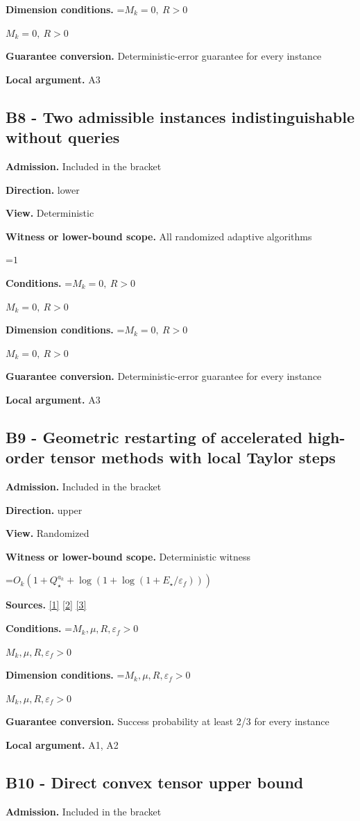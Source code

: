 \documentclass[10pt,a4paper]{article}
\newcommand{\AtlasMath}[1]{\par\begingroup\centering\setbox0=\hbox{$\displaystyle #1$}\ifdim\wd0>1.4\linewidth\typeout{ATLAS WIDE FORMULA: \the\wd0}\fi\ifdim\wd0>\linewidth\resizebox{\linewidth}{!}{\box0}\else\box0\fi\par\endgroup}
\newcommand{\AtlasInlineMath}[1]{\begingroup\setbox0=\hbox{$#1$}\ifdim\wd0>.4\linewidth\endgroup\AtlasMath{#1}\else\endgroup$#1$\fi}
\begin{document}
\textbf{Dimension conditions.} \AtlasInlineMath{M_k=0,\ R>0}

\textbf{Guarantee conversion.} Deterministic-error guarantee for every instance

\textbf{Local argument.} A3

\subsection{B8 - Two admissible instances indistinguishable without queries}
\textbf{Admission.} Included in the bracket

\textbf{Direction.} lower

\textbf{View.} Deterministic

\textbf{Witness or lower-bound scope.} All randomized adaptive algorithms

\AtlasMath{1}
\textbf{Conditions.} \AtlasInlineMath{M_k=0,\ R>0}

\textbf{Dimension conditions.} \AtlasInlineMath{M_k=0,\ R>0}

\textbf{Guarantee conversion.} Deterministic-error guarantee for every instance

\textbf{Local argument.} A3

\subsection{B9 - Geometric restarting of accelerated high-order tensor methods with local Taylor steps}
\textbf{Admission.} Included in the bracket

\textbf{Direction.} upper

\textbf{View.} Randomized

\textbf{Witness or lower-bound scope.} Deterministic witness

\AtlasMath{O_k(1+Q_\star^{a_k}+\log(1+\log(1+E_\star/\varepsilon_f)))}
\textbf{Sources.} \href{https://arxiv.org/pdf/2205.09647v1}{[1]} \href{https://arxiv.org/pdf/2010.06642v2}{[2]} \href{https://arxiv.org/pdf/1705.07260v2}{[3]}

\textbf{Conditions.} \AtlasInlineMath{M_k,\mu,R,\varepsilon_f>0}

\textbf{Dimension conditions.} \AtlasInlineMath{M_k,\mu,R,\varepsilon_f>0}

\textbf{Guarantee conversion.} Success probability at least 2/3 for every instance

\textbf{Local argument.} A1, A2

\subsection{B10 - Direct convex tensor upper bound}
\textbf{Admission.} Included in the bracket
\end{document}
